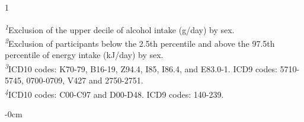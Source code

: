 \documentclass[nutrients,article,submit,moreauthors,pdftex]{Definitions/mdpi}
\begin{document}
\begin{table}[t]
\begin{tabular*}{1\linewidth}
\end{tabular*}
\begin{minipage}{\linewidth}
\textsuperscript{\textit{1}}Exclusion of the upper decile of alcohol intake (g/day) by sex.\\
\textsuperscript{\textit{2}}Exclusion of participants below the 2.5th percentile and above the 97.5th percentile of energy intake (kJ/day) by sex.\\
\textsuperscript{\textit{3}}ICD10 codes: K70-79, B16-19, Z94.4, I85, I86.4, and E83.0-1. ICD9 codes: 5710-5745, 0700-0709, V427 and 2750-2751.\\
\textsuperscript{\textit{4}}ICD10 codes: C00-C97 and D00-D48. ICD9 codes: 140-239.\\
\end{minipage}
\end{table}

\finishlandscape
\begin{adjustwidth}{-\extralength}{0cm}





%

\PublishersNote{}
\end{adjustwidth}
\end{document}
